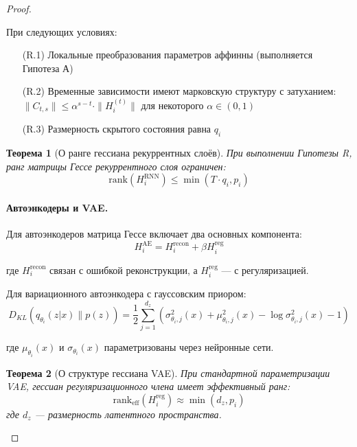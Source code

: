 \documentclass[a4paper,12pt]{article}
\newtheorem{theorem}{Теорема}
\begin{document}
\begin{proof}
    \begin{hypothesis}
    При следующих условиях:
    \begin{enumerate}
    \item[(R.1)] Локальные преобразования параметров аффинны (выполняется Гипотеза А)
    \item[(R.2)] Временные зависимости имеют марковскую структуру с затуханием: $\|C_{t,s}\| \leq \alpha^{s-t} \cdot \|H_i^{(t)}\|$ для некоторого $\alpha \in (0,1)$
    \item[(R.3)] Размерность скрытого состояния равна $q_i$
    \end{enumerate}
    \end{hypothesis}
    
    \begin{theorem}[О ранге гессиана рекуррентных слоёв]
    При выполнении Гипотезы R, ранг матрицы Гессе рекуррентного слоя ограничен:
    \begin{equation}
    \text{rank}(H_i^{\text{RNN}}) \leq \min(T \cdot q_i, p_i)
    \end{equation}
    \end{theorem}
    
    \paragraph{Автоэнкодеры и VAE.}
    Для автоэнкодеров матрица Гессе включает два основных компонента:
    \begin{equation}
    H_i^{\text{AE}} = H_i^{\text{recon}} + \beta H_i^{\text{reg}}
    \end{equation}
    
    где $H_i^{\text{recon}}$ связан с ошибкой реконструкции, а $H_i^{\text{reg}}$ — с регуляризацией.
    
    Для вариационного автоэнкодера с гауссовским приором:
    \begin{equation}
    D_{KL}(q_{\theta_i}(z|x) \| p(z)) = \frac{1}{2} \sum_{j=1}^{d_z} (\sigma_{\theta_i,j}^2(x) + \mu_{\theta_i,j}^2(x) - \log \sigma_{\theta_i,j}^2(x) - 1)
    \end{equation}
    
    где $\mu_{\theta_i}(x)$ и $\sigma_{\theta_i}(x)$ параметризованы через нейронные сети.
    
    \begin{theorem}[О структуре гессиана VAE]
    При стандартной параметризации VAE, гессиан регуляризационного члена имеет эффективный ранг:
    \begin{equation}
    \text{rank}_{\text{eff}}(H_i^{\text{reg}}) \approx \min(d_z, p_i)
    \end{equation}
    где $d_z$ — размерность латентного пространства.
    \end{theorem}
    

\end{proof}
\end{document}
